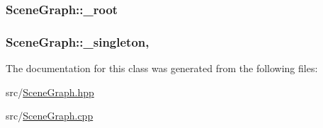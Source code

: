 \subsubsection[{\texorpdfstring{\+\_\+root}{_root}}]{ Scene\+Graph\+::\+\_\+root\hspace{0.3cm}{\ttfamily [private]}}\hypertarget{classSceneGraph_ad037f8ab479fb89e75a4648b71ec5a4a}{}\label{classSceneGraph_ad037f8ab479fb89e75a4648b71ec5a4a}
\subsubsection[{\texorpdfstring{\+\_\+singleton}{_singleton}}]{ Scene\+Graph\+::\+\_\+singleton\hspace{0.3cm}{\ttfamily [static]}, {\ttfamily [private]}}\hypertarget{classSceneGraph_a58167ed03dc516c39ef4a5a7aed3c605}{}\label{classSceneGraph_a58167ed03dc516c39ef4a5a7aed3c605}


The documentation for this class was generated from the following files\+:\begin{DoxyCompactItemize}
\item 
src/\hyperlink{SceneGraph_8hpp}{Scene\+Graph.\+hpp}\item 
src/\hyperlink{SceneGraph_8cpp}{Scene\+Graph.\+cpp}\end{DoxyCompactItemize}
